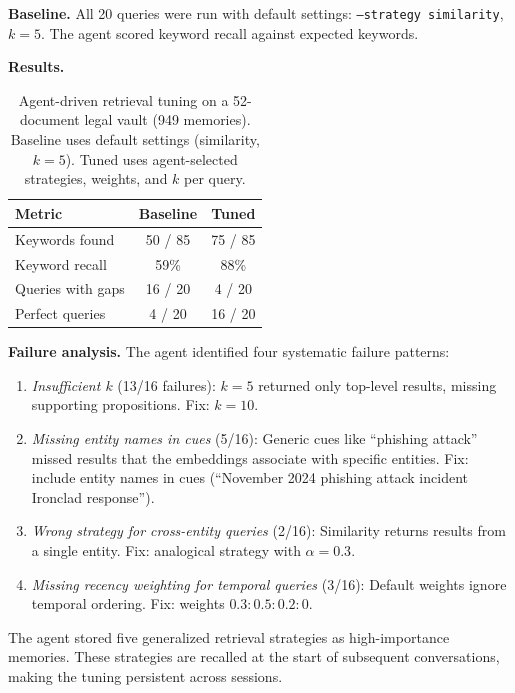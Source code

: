\documentclass{article}
\begin{document}
\textbf{Baseline.} All 20 queries were run with default settings: \texttt{--strategy similarity}, $k{=}5$. The agent scored keyword recall against expected keywords.

\textbf{Results.}

\begin{table}[h]
\centering
\caption{Agent-driven retrieval tuning on a 52-document legal vault (949 memories). Baseline uses default settings (similarity, $k{=}5$). Tuned uses agent-selected strategies, weights, and $k$ per query.}
\label{tab:tuning}
\small
\begin{tabular}{@{}lcc@{}}
\toprule
\textbf{Metric} & \textbf{Baseline} & \textbf{Tuned} \\
\midrule
Keywords found & 50 / 85 & 75 / 85 \\
Keyword recall & 59\% & 88\% \\
Queries with gaps & 16 / 20 & 4 / 20 \\
Perfect queries & 4 / 20 & 16 / 20 \\
\bottomrule
\end{tabular}
\end{table}

\textbf{Failure analysis.} The agent identified four systematic failure patterns:

\begin{enumerate}
    \item \emph{Insufficient $k$} (13/16 failures): $k{=}5$ returned only top-level results, missing supporting propositions. Fix: $k{=}10$.
    \item \emph{Missing entity names in cues} (5/16): Generic cues like ``phishing attack'' missed results that the embeddings associate with specific entities. Fix: include entity names in cues (``November 2024 phishing attack incident Ironclad response'').
    \item \emph{Wrong strategy for cross-entity queries} (2/16): Similarity returns results from a single entity. Fix: analogical strategy with $\alpha{=}0.3$.
    \item \emph{Missing recency weighting for temporal queries} (3/16): Default weights ignore temporal ordering. Fix: weights $0.3{:}0.5{:}0.2{:}0$.
\end{enumerate}

The agent stored five generalized retrieval strategies as high-importance memories. These strategies are recalled at the start of subsequent conversations, making the tuning persistent across sessions.
\end{document}
